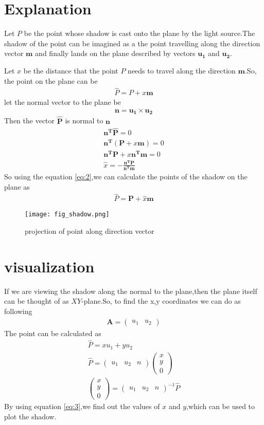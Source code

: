 \documentclass[journal,12pt,twocolumn]{IEEEtran}
\providecommand{\brak}[1]{\ensuremath{\left(#1\right)}}
\newcommand{\myvec}[1]{\ensuremath{\begin{pmatrix}#1\end{pmatrix}}}
\numberwithin{equation}{subsection}
\let\vec\mathbf
\begin{document}
\section{Explanation}
Let $P$ be the point whose shadow is cast onto the plane by the light source.The shadow of the point can be imagined as a the point travelling along the direction vector $\vec{m}$ and finally lands on the plane described by vectors $\vec{u_1}$ and $\vec{u_2}$.\par
Let $x$ be the distance that the point $P$ needs to travel along the direction $\vec{m}$.So, the point on the plane can be 
\begin{align}
    \hat{P}=P+x\vec{m}\label{eq:1}
\end{align}
let the normal vector to the plane be
\begin{align}
    \vec{n}=\vec{u_1}\times \vec{u_2}
\end{align}
Then the vector $\vec{\hat{P}}$ is normal to $\vec{n}$
\begin{align}
    \vec{n^T}\vec{\hat{P}}=0\\
    \vec{n^T}\brak{\vec{P}+x\vec{m}}=0\\
    \vec{n^T}\vec{P}+x\vec{n^T}\vec{m}=0\\
    \hat{x}=-\frac{\vec{n^T}\vec{P}}{\vec{n^T}\vec{m}}\label{eq:2}
\end{align}
So using the equation \eqref{eq:2},we can calculate the points of the shadow on the plane as
\begin{align}
    \hat{P}=\vec{P}+\hat{x}\vec{m}
\end{align}
\begin{figure}
    \centering
    \texttt{[image: fig\_shadow.png]}
    \caption{projection of point along direction vector}
    \label{fig:1}
\end{figure}
\section{visualization}
If we are viewing the shadow along the normal to the plane,then the plane itself can be thought of as $XY$-plane.So, to find the x,y coordinates we can do as following
\begin{align}
    \vec{A}=\myvec{u_1 & u_2}
\end{align}
The point can be calculated as
\begin{align}
    \hat{P}=xu_1+yu_2\\
    \hat{P}=\myvec{u_1 & u_2&n}\myvec{x\\y\\0}\\
    \myvec{x\\y\\0}=\myvec{u_1 & u_2&n}^{-1}\hat{P}\label{eq:3}
\end{align}
By using equation \eqref{eq:3},we find out the values of $x$ and $y$,which can be used to plot the shadow.
\end{document}
